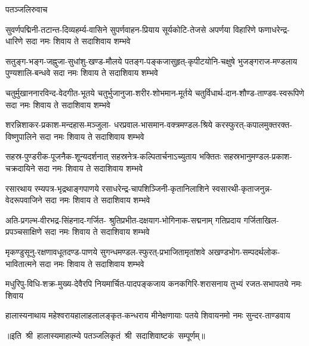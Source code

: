 
\centerline{पतञ्जलिरुवाच}
\fourlineindentedshloka
{सुवर्णपद्मिनी-तटान्त-दिव्यहर्म्य-वासिने}
{सुपर्णवाहन-प्रियाय सूर्यकोटि-तेजसे}
{अपर्णया विहारिणे फणाधरेन्द्र-धारिणे}
{सदा नमः शिवाय ते सदाशिवाय शम्भवे}

\fourlineindentedshloka
{सतुङ्ग-भङ्ग-जह्नुजा-सुधांशु-खण्ड-मौलये}
{पतङ्ग-पङ्कजासुहृत्-कृपीटयोनि-चक्षुषे}
{भुजङ्गराज-मण्डलाय पुण्यशालि-बन्धवे}
{सदा नमः शिवाय ते सदाशिवाय शम्भवे}

\fourlineindentedshloka
{चतुर्मुखाननारविन्द-वेदगीत-भूतये}
{चतुर्भुजानुजा-शरीर-शोभमान-मूर्तये}
{चतुर्विधार्थ-दान-शौण्ड-ताण्डव-स्वरूपिणे}
{सदा नमः शिवाय ते सदाशिवाय शम्भवे}

\fourlineindentedshloka
{शरन्निशाकर-प्रकाश-मन्दहास-मञ्जुला-}
{धरप्रवाल-भासमान-वक्त्रमण्डल-श्रिये}
{करस्फुरत्-कपालमुक्तरक्त-विष्णुपालिने}
{सदा नमः शिवाय ते सदाशिवाय शम्भवे}

\fourlineindentedshloka
{सहस्र-पुण्डरीक-पूजनैक-शून्यदर्शनात्}
{सहस्रनेत्र-कल्पितार्चनाऽच्युताय भक्तितः}
{सहस्रभानुमण्डल-प्रकाश-चक्रदायिने}
{सदा नमः शिवाय ते सदाशिवाय शम्भवे}

\fourlineindentedshloka
{रसारथाय रम्यपत्र-भृद्रथाङ्गपाणये}
{रसाधरेन्द्र-चापशिञ्जिनी-कृतानिलाशिने}
{स्वसारथी-कृताजनुन्न-वेदरूपवाजिने}
{सदा नमः शिवाय ते सदाशिवाय शम्भवे}

\fourlineindentedshloka
{अति-प्रगल्भ-वीरभद्र-सिंहनाद-गर्जित-}
{श्रुतिप्रभीत-दक्षयाग-भोगिनाक-सद्मनाम्}
{गतिप्रदाय गर्जिताखिल-प्रपञ्चसाक्षिणे}
{सदा नमः शिवाय ते सदाशिवाय शम्भवे}

\fourlineindentedshloka
{मृकण्डुसूनु-रक्षणावधूतदण्ड-पाणये}
{सुगन्धमण्डल-स्फुरत्-प्रभाजितामृतांशवे}
{अखण्डभोग-सम्पदर्थलोक-भावितात्मने}
{सदा नमः शिवाय ते सदाशिवाय शम्भवे}

\twolineshloka
{मधुरिपु-विधि-शक्र-मुख्य-देवैरपि नियमार्चित-पादपङ्कजाय}
{कनकगिरि-शरासनाय तुभ्यं रजत-सभापतये नमः शिवाय}

\fourlineindentedshloka
{हालास्यनाथाय महेश्वराय}{हालाहलालङ्कृत-कन्धराय}
{मीनेक्षणायाः पतये शिवाय}{नमो नमः सुन्दर-ताण्डवाय}

॥इति~श्री~हालास्यमाहात्म्ये पतञ्जलिकृतं~श्री~सदाशिवाष्टकं~सम्पूर्णम्॥
